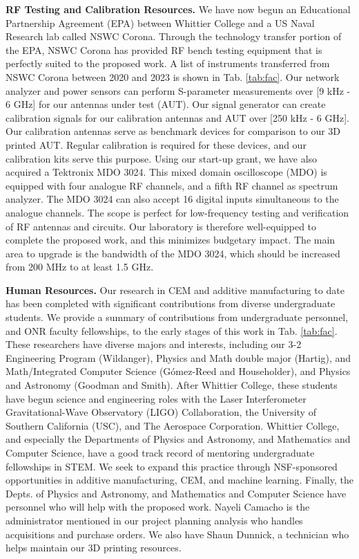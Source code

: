 \documentclass[../../main.tex]{subfiles}
\begin{document}
\textbf{RF Testing and Calibration Resources.}  We have now begun an Educational Partnership Agreement (EPA) between Whittier College and a US Naval Research lab called NSWC Corona.  Through the technology transfer portion of the EPA, NSWC Corona has provided RF bench testing equipment that is perfectly suited to the proposed work.  A list of instruments transferred from NSWC Corona between 2020 and 2023 is shown in Tab. \ref{tab:fac}.  Our network analyzer and power sensors can perform S-parameter measurements over [9 kHz - 6 GHz] for our antennas under test (AUT).  Our signal generator can create calibration signals for our calibration antennas and AUT over [250 kHz - 6 GHz].  Our calibration antennas serve as benchmark devices for comparison to our 3D printed AUT.  Regular calibration is required for these devices, and our calibration kits serve this purpose.  Using our start-up grant, we have also acquired a Tektronix MDO 3024.  This mixed domain oscilloscope (MDO) is equipped with four analogue RF channels, and a fifth RF channel as spectrum analyzer.  The MDO 3024 can also accept 16 digital inputs simultaneous to the analogue channels.  The scope is perfect for low-frequency testing and verification of RF antennas and circuits.  Our laboratory is therefore well-equipped to complete the proposed work, and this minimizes budgetary impact.  The main area to upgrade is the bandwidth of the MDO 3024, which should be increased from 200 MHz to at least 1.5 GHz.  \\ \vspace{2.5mm}

\textbf{Human Resources.} Our research in CEM and additive manufacturing to date has been completed with significant contributions from diverse undergraduate students.  We provide a summary of contributions from undergraduate personnel, and ONR faculty fellowships, to the early stages of this work in Tab. \ref{tab:fac}.  These researchers have diverse majors and interests, including our 3-2 Engineering Program (Wildanger), Physics and Math double major (Hartig), and Math/Integrated Computer Science (G\'{o}mez-Reed and Householder), and Physics and Astronomy (Goodman and Smith).   After Whittier College, these students have begun science and engineering roles with the Laser Interferometer Gravitational-Wave Observatory (LIGO) Collaboration, the University of Southern California (USC), and The Aerospace Corporation.  Whittier College, and especially the Departments of Physics and Astronomy, and Mathematics and Computer Science, have a good track record of mentoring undergraduate fellowships in STEM.  We seek to expand this practice through NSF-sponsored opportunities in additive manufacturing, CEM, and machine learning.  Finally, the Depts. of Physics and Astronomy, and Mathematics and Computer Science have personnel who will help with the proposed work.  Nayeli Camacho is the administrator mentioned in our project planning analysis who handles acquisitions and purchase orders.  We also have Shaun Dunnick, a technician who helps maintain our 3D printing resources. \\ \vspace{2.5mm}
\end{document}
